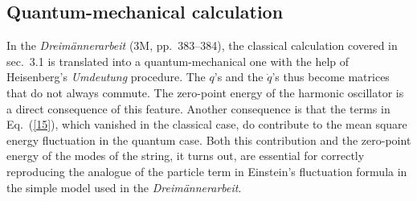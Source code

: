 \documentclass[12pt]{elsart}
\begin{document}

\subsection{Quantum-mechanical calculation}

In the {\it Dreim\"annerarbeit} (3M, pp.\ 383--384), the classical calculation covered in sec.\ 3.1 is translated into a quantum-mechanical one with the help of Heisenberg's {\it Umdeutung} procedure. The $q$'s and the $\dot{q}$'s thus become matrices that do not always commute. The zero-point energy of the harmonic oscillator is a direct consequence of this feature. Another consequence is that the terms in Eq.\ (\ref{15}), which vanished in the classical case, do contribute to the mean square energy fluctuation in the quantum case. Both this contribution and the zero-point energy of the modes of the string, it turns out, are essential for correctly reproducing the analogue of the particle term in Einstein's fluctuation formula in the simple model used in the {\it Dreim\"annerarbeit}. 
\end{document}
